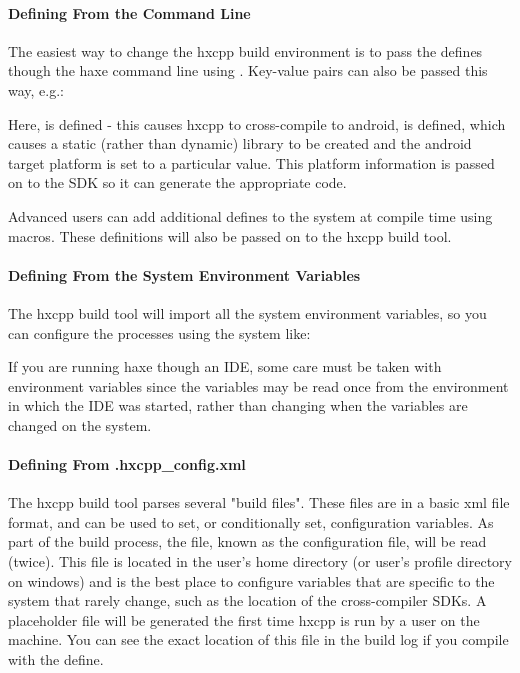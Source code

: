 \paragraph{Defining From the Command Line}
The easiest way to change the hxcpp build environment is to pass the defines though the haxe command line using .  Key-value pairs can also be passed this way, e.g.:


Here,  is defined - this causes hxcpp to cross-compile to android,  is defined, which causes a static (rather than dynamic) library to be created and the android target platform is set to a particular value.  This platform information is passed on to the SDK so it can generate the appropriate code.

Advanced users can add additional defines to the system at compile time using macros.  These definitions will also be passed on to the hxcpp build tool.

\paragraph{Defining From the System Environment Variables}
The hxcpp build tool will import all the system environment variables, so you can configure the processes using the system like:


If you are running haxe though an IDE, some care must be taken with environment variables since the variables may be read once from the environment in which the IDE was started, rather than changing when the variables are changed on the system.

\paragraph{Defining From .hxcpp_config.xml}
The hxcpp build tool parses several "build files".  These files are in a basic xml file format, and can be used to set, or conditionally set, configuration variables.  As part of the build process, the  file, known as the configuration file, will be read (twice).  This file is located in the user's home directory (or user's profile directory on windows) and is the best place to configure variables that are specific to the system that rarely change, such as the location of the cross-compiler SDKs.  A placeholder file will be generated the first time hxcpp is run by a user on the machine.  You can see the exact location of this file in the build log if you compile with the  define.


